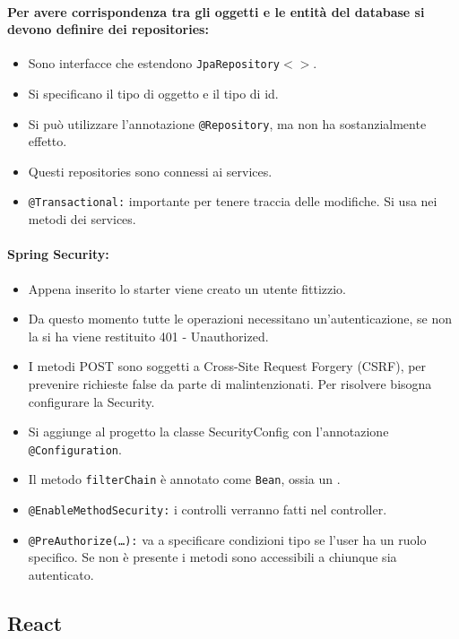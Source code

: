 \paragraph{Per avere corrispondenza tra gli oggetti e le entità del database si devono definire dei repositories:}

\begin{itemize}
	\item Sono interfacce che estendono \texttt{JpaRepository$<>$}.
	\item Si specificano il tipo di oggetto e il tipo di id.
	\item Si può utilizzare l'annotazione \texttt{@Repository}, ma non ha sostanzialmente effetto.
	\item Questi repositories sono connessi ai services.
	\item \texttt{@Transactional:} importante per tenere traccia delle modifiche. Si usa nei metodi dei services.
\end{itemize}


\paragraph{Spring Security:}

\begin{itemize}
	\item Appena inserito lo starter viene creato un utente fittizzio.
	\item Da questo momento tutte le operazioni necessitano un'autenticazione, se non la si ha viene restituito 401 - Unauthorized.
	\item I metodi POST sono soggetti a Cross-Site Request Forgery (CSRF), per prevenire richieste false da parte di malintenzionati. Per risolvere bisogna configurare la Security.
	\item Si aggiunge al progetto la classe SecurityConfig con l'annotazione \texttt{@Configuration}.
	\item Il metodo \texttt{filterChain} è annotato come \texttt{Bean}, ossia un .
	\item \texttt{@EnableMethodSecurity:} i controlli verranno fatti nel controller.
	\item \texttt{@PreAuthorize(\dots):} va a specificare condizioni tipo se l'user ha un ruolo specifico. Se non è presente i metodi sono accessibili a chiunque sia autenticato.
\end{itemize}

\subsection{React}





